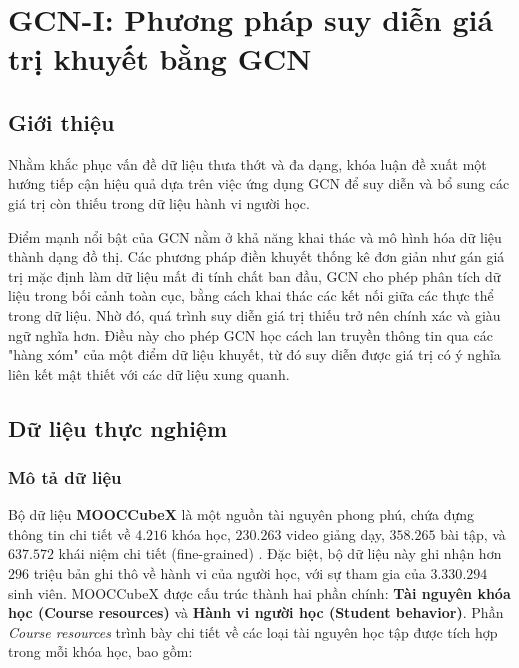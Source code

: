\chapter{GCN-I: Phương pháp suy diễn giá trị khuyết bằng GCN}
\label{chap:chap4}
\section{Giới thiệu}
Nhằm khắc phục vấn đề dữ liệu thưa thớt và đa dạng, khóa luận đề xuất một hướng tiếp cận hiệu quả dựa trên việc ứng dụng GCN để suy diễn và bổ sung các giá trị còn thiếu trong dữ liệu hành vi người học.

Điểm mạnh nổi bật của GCN nằm ở khả năng khai thác và mô hình hóa dữ liệu thành dạng đồ thị. Các phương pháp điền khuyết thống kê đơn giản như gán giá trị mặc định làm dữ liệu mất đi tính chất ban đầu, GCN cho phép phân tích dữ liệu trong bối cảnh toàn cục, bằng cách khai thác các kết nối giữa các thực thể trong dữ liệu. Nhờ đó, quá trình suy diễn giá trị thiếu trở nên chính xác và giàu ngữ nghĩa hơn. Điều này cho phép GCN học cách lan truyền thông tin qua các "hàng xóm" của một điểm dữ liệu khuyết, từ đó suy diễn được giá trị có ý nghĩa liên kết mật thiết với các dữ liệu xung quanh.


\section{Dữ liệu thực nghiệm}
\subsection{Mô tả dữ liệu}
Bộ dữ liệu \textbf{MOOCCubeX} là một nguồn tài nguyên phong phú, chứa đựng thông tin chi tiết về $4.216$ khóa học, $230.263$ video giảng dạy, $358.265$ bài tập, và $637.572$ khái niệm chi tiết (fine-grained) \cite{yu2021mooccubex}. Đặc biệt, bộ dữ liệu này ghi nhận hơn $296$ triệu bản ghi thô về hành vi của người học, với sự tham gia của $3.330.294$ sinh viên. MOOCCubeX được cấu trúc thành hai phần chính: \textbf{Tài nguyên khóa học (Course resources)} và \textbf{Hành vi người học (Student behavior)}.
Phần \textit{Course resources} trình bày chi tiết về các loại tài nguyên học tập được tích hợp trong mỗi khóa học, bao gồm:

